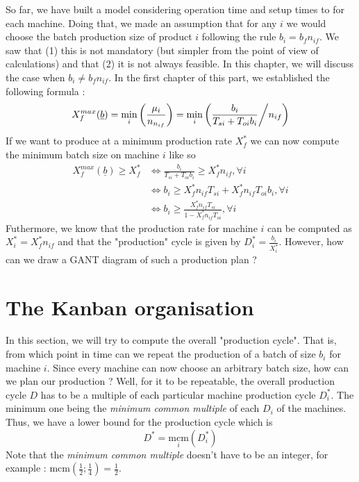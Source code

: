 So far, we have built a model considering operation time and setup times to for each machine. Doing that, we made an assumption that for any $i$ we would choose the batch production size of product $i$ following the rule $b_i = b_fn_{if}$. We saw that (1) this is not mandatory (but simpler from the point of view of calculations) and that (2) it is not always feasible. In this chapter, we will discuss the case when $b_i \ne b_fn_{if}$. In the first chapter of this part, we established the following formula : 
\[ X_f^{max}(\underline b) = \min_i\left( \frac{\mu_i}{n_{n_{if}}}\right) = \min_i\left( \frac{b_i}{T_{si} + T_{oi}b_i} \middle/ n_{if} \right) \] If we want to produce at a minimum production rate $X_f^*$ we can now compute the minimum batch size on machine $i$ like so \[
    \begin{split}
        X_f^{max}(\underline b) \ge X_f^*
            &\Leftrightarrow \frac{b_i}{T_{si}+T_{oi}b_i}\ge X_f^*n_{if},\forall i\\
            &\Leftrightarrow b_i\ge X_f^*n_{if}T_{si} + X_f^*n_{if}T_{oi}b_i,\forall i\\
            &\Leftrightarrow b_i\ge \frac{X_f^*n_{if}T_{si}}{1 - X_f^*n_{if}T_{oi}}, \forall i
    \end{split}
\]
Futhermore, we know that the production rate for machine $i$ can be computed as $X_i^*=X_f^*n_{if}$ and that the "production" cycle is given by $D_i^*=\frac{b_i}{X_i^*}$. However, how can we draw a GANT diagram of such a production plan ?

\section{The Kanban organisation}

In this section, we will try to compute the overall "production cycle". That is, from which point in time can we repeat the production of a batch of size $b_i$ for machine $i$. Since every machine can now choose an arbitrary batch size, how can we plan our production ? Well, for it to be repeatable, the overall production cycle $D$ has to be a multiple of each particular machine production cycle $D_i^*$. The minimum one being the \emph{minimum common multiple} of each $D_i$ of the machines. Thus, we have a lower bound for the production cycle which is \[ D^* = \underset{i}{\textrm{mcm}}(D_i^*) \]Note that the \emph{minimum common multiple} doesn't have to be an integer, for example : $\textrm{mcm}\left( \frac{1}{2} ; \frac{1}{4} \right) = \frac{1}{2}$. 

